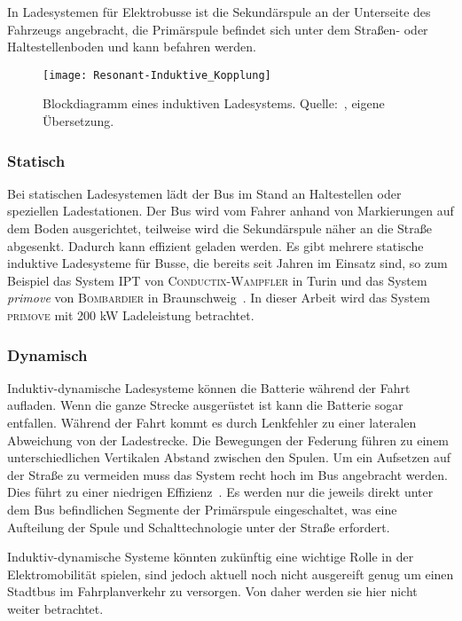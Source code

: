 In Ladesystemen für Elektrobusse ist die Sekundärspule an der Unterseite des Fahrzeugs angebracht, die Primärspule befindet sich unter dem Straßen- oder Haltestellenboden und kann befahren werden.

\begin{figure}\centering
	\texttt{[image: Resonant-Induktive\_Kopplung]}
	\caption[Blockdiagramm eines induktiven Ladesystems]{Blockdiagramm eines induktiven Ladesystems. Quelle:~\cite{lukic2013cutting}, eigene Übersetzung.}
	\label{abb_ResIndKopplung}
\end{figure}

\subsubsection{Statisch}
Bei statischen Ladesystemen lädt der Bus im Stand an Haltestellen oder speziellen Ladestationen. Der Bus wird vom Fahrer anhand von Markierungen auf dem Boden ausgerichtet, teilweise wird die Sekundärspule näher an die Straße abgesenkt. Dadurch kann effizient geladen werden. Es gibt mehrere statische induktive Ladesysteme für Busse, die bereits seit Jahren im Einsatz sind, so zum Beispiel das System \textsc{IPT} von \textsc{Conductix-Wampfler} in Turin und das System \emph{primove} von \textsc{Bombardier} in Braunschweig~\cite{WeIPT}. In dieser Arbeit wird das System \textsc{primove} mit 200 kW Ladeleistung betrachtet.

\subsubsection{Dynamisch}
Induktiv-dynamische Ladesysteme können die Batterie während der Fahrt aufladen. Wenn die ganze Strecke ausgerüstet ist kann die Batterie sogar entfallen. Während der Fahrt kommt es durch Lenkfehler zu einer lateralen Abweichung von der Ladestrecke. Die Bewegungen der Federung führen zu einem unterschiedlichen Vertikalen Abstand zwischen den Spulen. Um ein Aufsetzen auf der Straße zu vermeiden muss das System recht hoch im Bus angebracht werden. Dies führt zu einer niedrigen Effizienz~\cite{5618092}. Es werden nur die jeweils direkt unter dem Bus befindlichen Segmente der Primärspule eingeschaltet, was eine Aufteilung der Spule und Schalttechnologie unter der Straße erfordert.

Induktiv-dynamische Systeme könnten zukünftig eine wichtige Rolle in der Elektromobilität spielen, sind jedoch aktuell noch nicht ausgereift genug um einen Stadtbus im Fahrplanverkehr zu versorgen. Von daher werden sie hier nicht weiter betrachtet. 

